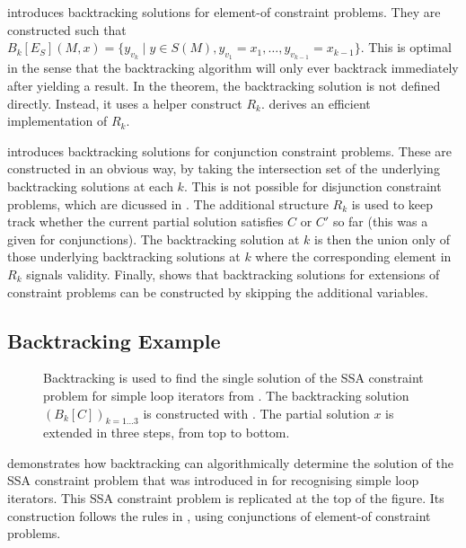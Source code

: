     introduces backtracking solutions for element-of
    constraint problems.
    They are constructed such that
    $B_k[E_S](M,x)=\{y_{v_k}\mid y\in S(M), y_{v_1}=x_1,\dots,y_{v_{k-1}}=x_{k-1}\}$.
    This is optimal in the sense that the backtracking algorithm will only ever
    backtrack immediately after yielding a result.
    In the theorem, the backtracking solution is not defined directly.
    Instead, it uses a helper construct $R_k$.
     derives an efficient implementation of $R_k$.

     introduces backtracking solutions for conjunction
    constraint problems.
    These are constructed in an obvious way, by taking the intersection set of
    the underlying backtracking solutions at each $k$.
    This is not possible for disjunction constraint problems, which are dicussed
    in .
    The additional structure $R_k$ is used to keep track whether the current
    partial solution satisfies $C$ or $C'$ so far
    (this was a given for conjunctions).
    The backtracking solution at $k$ is then the union only of those underlying
    backtracking solutions at $k$ where the corresponding element in $R_k$
    signals validity.
    Finally,  shows that backtracking solutions for extensions
    of constraint problems can be constructed by skipping the
    additional variables.

\subsection{Backtracking Example}

\begin{figure}[p]
    
    \caption{Backtracking is used to find the single solution of the
             SSA constraint problem for simple loop iterators from
             .
             The backtracking solution $(B_k[C])_{k=1\dots3}$ is constructed
             with .
             The partial solution $x$  is extended in three steps, from top to
             bottom.\parfillskip=0pt}
    \label{fig:backtracsol}
\end{figure}

     demonstrates how backtracking can algorithmically
    determine the solution of the SSA constraint problem that was introduced in
     for recognising simple loop iterators.
    This SSA constraint problem is replicated at the top of the figure.
    Its construction follows the rules in
    , using conjunctions
    of element-of constraint problems.

